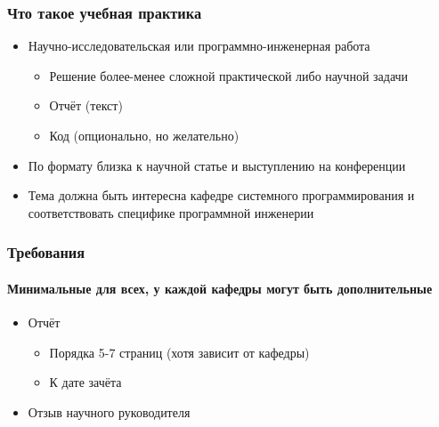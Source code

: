 \documentclass{../../slides-style}
\begin{document}
    
    \begin{frame}[plain]
        \titlepage
    \end{frame}

    \begin{frame}
        \frametitle{Что такое учебная практика}
        \begin{itemize}
            \item Научно-исследовательская или программно-инженерная работа%
            \begin{itemize}
                \item Решение более-менее сложной практической либо научной задачи
                \item Отчёт (текст)
                \item Код (опционально, но желательно)
            \end{itemize}
            \item По формату близка к научной статье и выступлению на конференции
            \item Тема должна быть интересна кафедре системного программирования и соответствовать специфике программной инженерии
        \end{itemize}
    \end{frame}

    \begin{frame}
        \frametitle{Требования}
        \framesubtitle{Минимальные для всех, у каждой кафедры могут быть дополнительные}
        \begin{itemize}
            \item Отчёт
            \begin{itemize}
                \item Порядка 5-7 страниц (хотя зависит от кафедры)
                \item К дате зачёта
            \end{itemize}
            \item Отзыв научного руководителя
        \end{itemize}
    \end{frame}
\end{document}

